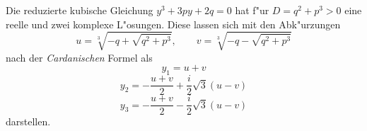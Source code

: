 \documentclass{article}
\begin{document}
Die reduzierte kubische Gleichung $y^3 + 3py +2q = 0$ hat f"ur
$D = q^2 + p^3 > 0$
eine reelle und zwei komplexe L"osungen. Diese lassen sich mit den Abk"urzungen
\[ u = \sqrt[3]{-q + \sqrt{q^2+p^3}},\qquad v = \sqrt[3]{-q - \sqrt{q^2+p^3}} \]
nach der \emph{Cardanischen} Formel als
\begin{equation} y_1 = u + v \end{equation}
\begin{equation}
   y_2 = -\frac{u+v}{2} + \frac{i}{2}\sqrt{3}(u - v)
\end{equation}
\begin{equation}
   y_3 = -\frac{u+v}{2} - \frac{i}{2}\sqrt{3}(u-v)
\end{equation}
darstellen.
\end{document}
